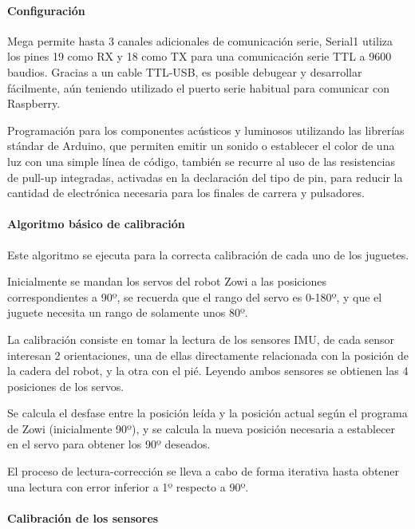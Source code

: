\paragraph{Configuración}

Mega permite hasta 3 canales adicionales de comunicación serie, Serial1 utiliza los pines 19 como RX y 18 como TX para una comunicación serie TTL a 9600 baudios. Gracias a un cable TTL-USB, es posible debugear y desarrollar fácilmente, aún teniendo utilizado el puerto serie habitual para comunicar con Raspberry.

Programación para los componentes acústicos y luminosos utilizando las librerías stándar de Arduino, que permiten emitir un sonido o establecer el color de una luz con una simple línea de código, también se recurre al uso de las resistencias de pull-up integradas, activadas en la declaración del tipo de pin, para reducir la cantidad de electrónica necesaria para los finales de carrera y pulsadores.

\paragraph{Algoritmo básico de calibración}

Este algoritmo se ejecuta para la correcta calibración de cada uno de los juguetes.

Inicialmente se mandan los servos del robot Zowi a las posiciones correspondientes a 90º, se recuerda que el rango del servo es 0-180º, y que el juguete necesita un rango de solamente unos 80º.

La calibración consiste en tomar la lectura de los sensores IMU, de cada sensor interesan 2 orientaciones, una de ellas directamente relacionada con la posición de la cadera del robot, y la otra con el pié. Leyendo ambos sensores se obtienen las 4 posiciones de los servos.

Se calcula el desfase entre la posición leída y la posición actual según el programa de Zowi (inicialmente 90º), y se calcula la nueva posición necesaria a establecer en el servo para obtener los 90º deseados.

El proceso de lectura-corrección se lleva a cabo de forma iterativa hasta obtener una lectura con error inferior a 1º respecto a 90º.

\paragraph{Calibración de los sensores}

